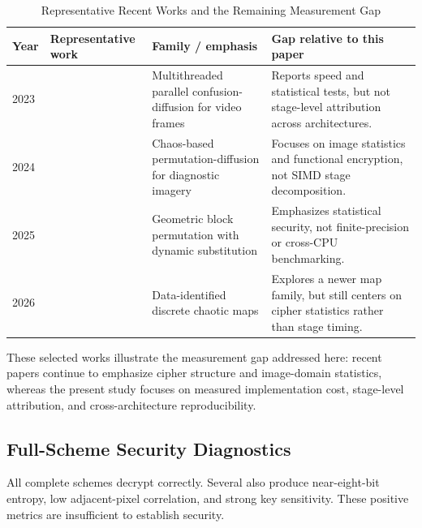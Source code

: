 \documentclass[twocolumn,runningheads]{svjour3}
\begin{document}
\begin{table}[t]
\caption{Representative Recent Works and the Remaining Measurement Gap}
\label{tab:recent-work}
\centering
\setlength{\tabcolsep}{4pt}
\begin{tabular}{p{}p{}p{}p{}}
\toprule
\textbf{Year} & \textbf{Representative work} & \textbf{Family / emphasis} & \textbf{Gap relative to this paper} \\
\midrule
2023 & \cite{jiang2023} & Multithreaded parallel confusion-diffusion for video frames & Reports speed and statistical tests, but not stage-level attribution across architectures. \\
2024 & \cite{sanaboina2024} & Chaos-based permutation-diffusion for diagnostic imagery & Focuses on image statistics and functional encryption, not SIMD stage decomposition. \\
2025 & \cite{ali2025} & Geometric block permutation with dynamic substitution & Emphasizes statistical security, not finite-precision or cross-CPU benchmarking. \\
2026 & \cite{li2026} & Data-identified discrete chaotic maps & Explores a newer map family, but still centers on cipher statistics rather than stage timing. \\
\bottomrule
\end{tabular}
\end{table}

These selected works illustrate the measurement gap addressed here: recent
papers continue to emphasize cipher structure and image-domain statistics,
whereas the present study focuses on measured implementation cost,
stage-level attribution, and cross-architecture reproducibility.

\subsection{Full-Scheme Security Diagnostics}
All complete schemes decrypt correctly. Several also produce near-eight-bit
entropy, low adjacent-pixel correlation, and strong key sensitivity. These
positive metrics are insufficient to establish security.
\end{document}
